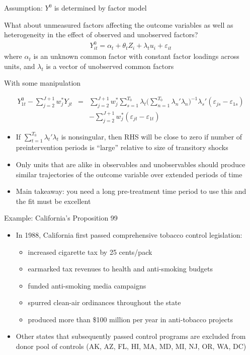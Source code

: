 \documentclass{beamer}
\begin{document}
\begin{frame}{Assumption: $Y^0$ is determined by factor model}

What about unmeasured factors affecting the outcome variables as well as heterogeneity in the effect of observed and unobserved factors?
\begin{eqnarray*}
Y_{it}^0 = \alpha_t + \theta_t Z_i + \lambda_t u_i + \varepsilon_{it}
\end{eqnarray*}where $\alpha_t$ is an unknown common factor with constant factor loadings across units, and $\lambda_t$ is a vector of unobserved common factors

\end{frame}

\begin{frame}{With some manipulation}

\begin{eqnarray*}
Y^0_{1t} - \sum^{J+1}_{j=2}w^*_jY_{jt} &=& \sum_{j=2}^{J+1} w_j^* \sum_{s=1}^{T_0} \lambda_t \bigg ( \sum_{n=1}^{T_0} \lambda_n'\lambda_n \bigg )
^{-1} \lambda_s'(\varepsilon_{js} - \varepsilon_{1s} ) \\
&& - \sum_{j=2}^{J+1} w_j^* (\varepsilon_{jt} - \varepsilon_{1t})
\end{eqnarray*}

\begin{itemize}
\item If $\sum_{t=1}^{T_0} \lambda_t' \lambda_t$ is nonsingular, then RHS will be close to zero if number of preintervention periods is ``large''  relative to size of transitory shocks 
\item Only units that are alike in observables and unobservables should produce similar trajectories of the outcome variable over extended periods of time
\item Main takeaway: you need a long pre-treatment time period to use this and the fit must be excellent
\end{itemize}


\end{frame}


\begin{frame}{Example: California's Proposition 99}
	
	\begin{itemize}
	\item In 1988, California first passed comprehensive tobacco control legislation:
		\begin{itemize}
		\item increased cigarette tax by 25 cents/pack
		\item earmarked tax revenues to health and anti-smoking budgets
		\item funded anti-smoking media campaigns
		\item spurred clean-air ordinances throughout the state
		\item produced more than \$100 million per year in anti-tobacco projects
		\end{itemize}
	\item Other states that subsequently passed control programs are excluded from donor pool of controls (AK, AZ, FL, HI, MA, MD, MI, NJ, OR, WA, DC)
	\end{itemize}
\end{frame}
\end{document}
